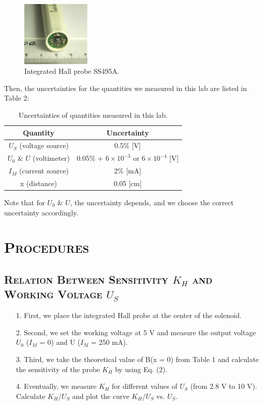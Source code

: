 \documentclass[a4paper,12pt]{article}
\begin{document}
\begin{figure}[H] 
    \centering
    \includegraphics[width=0.3\textwidth]{Fig6} 
    \caption{Integrated Hall probe SS495A.\cite{labmanual}} 
\end{figure}

Then, the uncertainties for the quantities we measured in this lab are listed in Table 2:

\begin{table}[H]
\begin{center}
\begin{tabular}{|c|c|}
\hline
Quantity & Uncertainty \\ \hline
$U_S$ (voltage source) & 0.5\% {[}V{]} \\ \hline
$U_0$ \& $U$ (voltimeter) & 0.05\% + $6\times 10^{-3}$ or $6\times 10^{-4}$ {[}V{]} \\ \hline
$I_M$ (current source) & 2\% {[}mA{]} \\ \hline
x (distance) & 0.05 {[}cm{]} \\ \hline
\end{tabular}
\caption{Uncertainties of quantities measured in this lab.}
\end{center}
\end{table}
Note that for $U_0$ \& $U$, the uncertainty depends, and we choose the correct uncertainty accordingly.

\section{\textsc{Procedures \cite{labmanual}}}
\subsection{\textsc{Relation Between Sensitivity $K_H$ and Working Voltage $U_S$}}
\begin{itemize}
\item[1.] First, we place the integrated Hall probe at the center of the solenoid.
\item[2.] Second, we set the working voltage at 5 V and measure the output voltage $U_0$ ($I_M$ = 0) and U ($I_M$ = 250 mA).
\item[3.] Third, we take the theoretical value of B(x = 0) from Table 1 and calculate the sensitivity of the probe $K_H$ by using Eq. (2).
\item[4.] Eventually, we measure $K_H$ for different values of $U_S$ (from 2.8 V to 10 V). Calculate $K_H$/$U_S$ and plot the curve $K_H$/$U_S$ vs. $U_S$.
\end{itemize}
\end{document}
